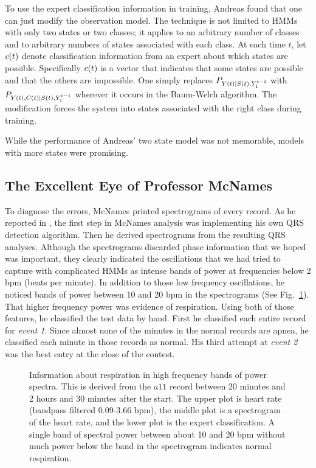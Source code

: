 To use the expert classification information in training, Andreas
found that one can just modify the observation model.  The technique
is not limited to HMMs with only two states or two classes; it applies
to an arbitrary number of classes and to arbitrary numbers of states
associated with each class.  At each time $t$, let ${c}{(t)}$ denote
classification information from an expert about which states are
possible.  Specifically ${c}{(t)}$ is a vector that indicates that
some states are possible and that the others are impossible.  One
simply replaces $P_{{Y}{(t)}|{S}{(t)},Y_{1}^{t-1}}$ with
$P_{{Y}{(t)},{C}{(t)}|{S}{(t)},Y_{1}^{t-1}}$ wherever it occurs
in the Baum-Welch algorithm.  The modification forces the system into
states associated with the right class during training.

While the performance of Andreas' two state model was not memorable,
models with more states were promising.

\subsection{The Excellent Eye of Professor McNames}
\label{sec:mcnames}

To diagnose the errors, McNames printed spectrograms of every record.
As he reported in \cite{mcnames2000}, the first step in McNames
analysis was implementing his own QRS detection algorithm.  Then he
derived spectrograms from the resulting QRS analyses.  Although the
spectrograms discarded phase information that we hoped was important,
they clearly indicated the oscillations that we had tried to capture
with complicated HMMs as intense bands of power at frequencies below 2
bpm (beats per minute).%
%
In addition to those low frequency oscillations, he noticed bands of
power between 10 and 20 bpm in the spectrograms (See
Fig.~\ref{fig:sgram}).  That higher frequency power was evidence of
respiration.  Using both of those features, he classified the test
data by hand.  First he classified each entire record for \emph{event
  1}.  Since almost none of the minutes in the normal records are
apnea, he classified each minute in those records as normal.  His
third attempt at \emph{event 2} was the best entry at the close of the
contest.

\begin{figure}
  \caption[Information about respiration in high
  frequency phase variations]%
  {Information about respiration in high frequency bands of power
    spectra.  This is derived from the $a11$ record between 20 minutes
    and 2 hours and 30 minutes after the start.  The upper plot is
    heart rate (bandpass filtered 0.09-3.66 bpm), the middle plot is a
    spectrogram of the heart rate, and the lower plot is the expert
    classification.  A single band of spectral power between about 10
    and 20 bpm without much power below the band in the spectrogram
    indicates normal respiration.}
  \label{fig:sgram}
\end{figure}

